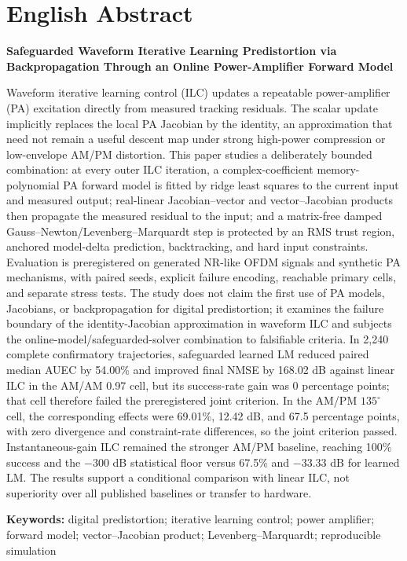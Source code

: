 \documentclass[UTF8,zihao=-4,a4paper]{ctexart}
\newcommand{\PaperTitleEN}{Safeguarded Waveform Iterative Learning Predistortion via Backpropagation Through an Online Power-Amplifier Forward Model}
\begin{document}
\section*{English Abstract}
\begin{center}
  \textbf{\PaperTitleEN}
\end{center}
\noindent
Waveform iterative learning control (ILC) updates a repeatable power-amplifier (PA) excitation directly
from measured tracking residuals. The scalar update implicitly replaces the local PA Jacobian by the
identity, an approximation that need not remain a useful descent map under strong high-power compression
or low-envelope AM/PM distortion. This paper studies a deliberately bounded combination: at every outer
ILC iteration, a complex-coefficient memory-polynomial PA forward model is fitted by ridge least squares
to the current input and measured output; real-linear Jacobian--vector and vector--Jacobian products then
propagate the measured residual to the input; and a matrix-free damped Gauss--Newton/Levenberg--Marquardt
step is protected by an RMS trust region, anchored model-delta prediction, backtracking, and hard input
constraints. Evaluation is preregistered on generated NR-like OFDM signals and synthetic PA mechanisms,
with paired seeds, explicit failure encoding, reachable primary cells, and separate stress tests. The
study does not claim the first use of PA models, Jacobians, or backpropagation for digital predistortion;
it examines the failure boundary of the identity-Jacobian approximation in waveform ILC and subjects the
online-model/safeguarded-solver combination to falsifiable criteria. In 2,240 complete confirmatory
trajectories, safeguarded learned LM reduced paired median AUEC by 54.00\% and improved final NMSE by
168.02 dB against linear ILC in the AM/AM 0.97 cell, but its success-rate gain was 0 percentage points;
that cell therefore failed the preregistered joint criterion. In the AM/PM $135^\circ$ cell, the
corresponding effects were 69.01\%, 12.42 dB, and 67.5 percentage points, with zero divergence and
constraint-rate differences, so the joint criterion passed. Instantaneous-gain ILC remained the stronger
AM/PM baseline, reaching 100\% success and the $-300$ dB statistical floor versus 67.5\% and $-33.33$ dB
for learned LM. The results support a conditional comparison with linear ILC, not superiority over all
published baselines or transfer to hardware.

\vspace{0.6em}
\noindent\textbf{Keywords:} digital predistortion; iterative learning control; power amplifier; forward
model; vector--Jacobian product; Levenberg--Marquardt; reproducible simulation
\end{document}
